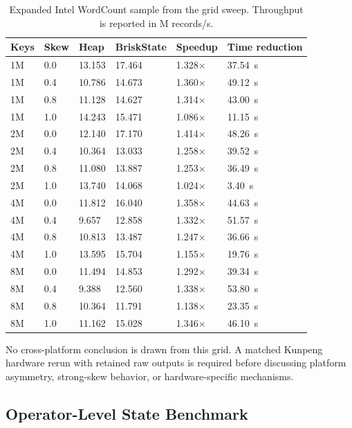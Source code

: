 \documentclass[journal]{IEEEtran}
\newcommand{\briskstate}{BriskState\xspace}
\newcommand{\system}{\briskstate}
\begin{document}
\begin{table}[t]
\caption{Expanded Intel WordCount sample from the grid sweep. Throughput is reported in M records/s.}
\label{tab:wordcount-detail}
\centering
\scriptsize
\begin{tabular}{C{1.2cm}C{0.9cm}C{1.4cm}C{1.4cm}C{1.2cm}C{1.4cm}}
\toprule
Keys & Skew & Heap & \system & Speedup & Time reduction \\
\midrule
1M & 0.0 & 13.153 & 17.464 & 1.328$\times$ & 37.54~s \\
1M & 0.4 & 10.786 & 14.673 & 1.360$\times$ & 49.12~s \\
1M & 0.8 & 11.128 & 14.627 & 1.314$\times$ & 43.00~s \\
1M & 1.0 & 14.243 & 15.471 & 1.086$\times$ & 11.15~s \\
2M & 0.0 & 12.140 & 17.170 & 1.414$\times$ & 48.26~s \\
2M & 0.4 & 10.364 & 13.033 & 1.258$\times$ & 39.52~s \\
2M & 0.8 & 11.080 & 13.887 & 1.253$\times$ & 36.49~s \\
2M & 1.0 & 13.740 & 14.068 & 1.024$\times$ & 3.40~s \\
4M & 0.0 & 11.812 & 16.040 & 1.358$\times$ & 44.63~s \\
4M & 0.4 & 9.657 & 12.858 & 1.332$\times$ & 51.57~s \\
4M & 0.8 & 10.813 & 13.487 & 1.247$\times$ & 36.66~s \\
4M & 1.0 & 13.595 & 15.704 & 1.155$\times$ & 19.76~s \\
8M & 0.0 & 11.494 & 14.853 & 1.292$\times$ & 39.34~s \\
8M & 0.4 & 9.388 & 12.560 & 1.338$\times$ & 53.80~s \\
8M & 0.8 & 10.364 & 11.791 & 1.138$\times$ & 23.35~s \\
8M & 1.0 & 11.162 & 15.028 & 1.346$\times$ & 46.10~s \\
\bottomrule
\end{tabular}
\end{table}

No cross-platform conclusion is drawn from this grid. A matched Kunpeng hardware rerun with retained raw outputs is required before discussing platform asymmetry, strong-skew behavior, or hardware-specific mechanisms.

\subsection{Operator-Level State Benchmark}
\end{document}

